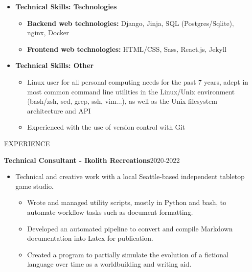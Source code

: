 \documentclass[11pt]{article}
\newcommand{\betteruline}[1]{
    \uline{#1}
}
\newcommand{\sectiontitle}[1]{
    \begingroup
        \titlebold
        \betteruline{\Large\uppercase{#1}  }
        \vspace{1.7mm}
    \endgroup
}
\newcommand{\sectioncontent}[1]{
    \begingroup
        \begin{FlushLeft}
        \vspace{-3mm}
        \sffamily\small#1
        \end{FlushLeft}
    \endgroup
    \vspace{2mm}
}
\begin{document}
\begin{paracol}{2}
{\begin{itemize}
        \item \textbf{Technical Skills: Technologies}
            \begin{itemize}
                \item \textbf{Backend web technologies:} Django, Jinja, SQL (Postgres/Sqlite), nginx, Docker
                \item \textbf{Frontend web technologies:} HTML/CSS, Sass, React.js, Jekyll 
            \end{itemize}

        \item \textbf{Technical Skills: Other}
          \begin{itemize}
            \item  Linux user for all personal computing needs for the past 7 years, adept in most common command line utilities in the Linux/Unix environment (bash/zsh, sed, grep, ssh, vim...), as well as the Unix filesystem architecture and API
            \item Experienced with the use of version control with Git
          \end{itemize}
      \end{itemize}
    }

        \sectiontitle{Experience} 
        \sectioncontent{
        \begingroup
      \textbf{Technical Consultant - Ikolith Recreations}\hfill\color{black!70}\small{2020-2022}
        \endgroup
      \begin{itemize}
          \item Technical and creative work with a local Seattle-based independent tabletop game studio. 
              \begin{itemize}
                  \item Wrote and managed utility scripts, mostly in Python and bash, to automate workflow tasks such as document formatting.
                    \item Developed an automated pipeline to convert and compile Markdown documentation into Latex for publication.
                    \item Created a program to partially simulate the evolution of a fictional language over time as a worldbuilding and writing aid.
              \end{itemize}
        \end{itemize}
        }



\end{paracol}
\end{document}
